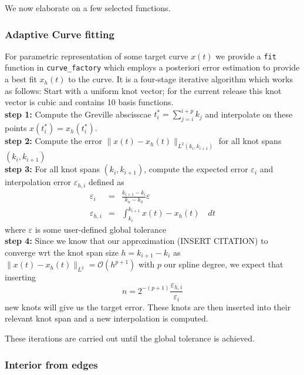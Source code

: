 \documentclass[preprint,12pt, a4paper]{elsarticle}
\begin{document}
We now elaborate on a few selected functions.

\subsubsection{Adaptive Curve fitting}
\label{sec:adaptive-curve-fit}
For parametric representation of some target curve $x(t)$ we provide a \texttt{fit} function in \texttt{curve\_factory} which employs a posteriori error estimation to provide a best fit $x_h(t)$ to the curve.
It is a four-stage iterative algorithm which works as follows:
Start with a uniform knot vector; for the current release this knot vector is cubic and contains 10  basis functions.
\\ \textbf{step 1:}
Compute the Greville abscisscae $t^*_i = \sum_{j=i}^{i+p} k_j$ and interpolate on these points $x(t_i^*) = x_h(t_i^*)$.
\\ \textbf{step 2:}
Compute the error $\|x(t)-x_h(t)\|_{L^2(k_i,k_{i+1})}$ for all knot spans $(k_i,k_{i+1})$
\\ \textbf{step 3:}
For all knot spans $(k_i,k_{i+1})$, compute the expected error $\varepsilon_i$ and interpolation error $\varepsilon_{h,i}$ defined as
\begin{eqnarray}
    \varepsilon_i     & = & \frac{k_{i+1} - k_i}{k_n - k_0}\varepsilon \\
    \varepsilon_{h,i} & = & \int_{k_i}^{k_{i+1}} x(t) - x_h(t)\quad dt
\end{eqnarray}
where $\varepsilon$ is some user-defined global tolerance
\\ \textbf{step 4:}
Since we know that our approximation (INSERT CITATION) to converge wrt the knot span size $h=k_{i+1}-k_i$ as $\|x(t)-x_h(t)\|_{L^2} = \mathcal{O}(h^{p+1})$ with $p$ our spline degree, we expect that inserting
\begin{equation}
    n = 2^{-(p+1)}\frac{\varepsilon_{h,i}}{\varepsilon_i}
\end{equation}
new knots will give us the target error.
These knots are then inserted into their relevant knot span and a new interpolation is computed.

These iterations are carried out until the global tolerance is achieved.

\subsubsection{Interior from edges}
\label{sec:interior-from-edges}
\end{document}
